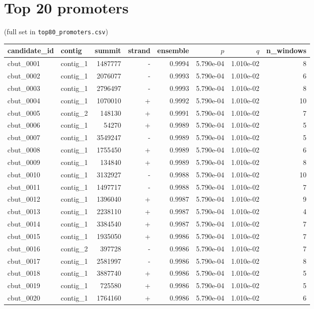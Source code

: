 \documentclass{article}
\begin{document}
\section*{Top 20 promoters}
(full set in \texttt{top80\_promoters.csv})
\begin{center}
\begin{tabular}{llrrrrrr}
\toprule
candidate\_id & contig & summit & strand & ensemble & $p$ & $q$ & n\_windows \\
\midrule
cbut\_0001 & contig\_1 & 1487777 & - & 0.9994 & 5.790e-04 & 1.010e-02 & 8 \\
cbut\_0002 & contig\_1 & 2076077 & - & 0.9993 & 5.790e-04 & 1.010e-02 & 6 \\
cbut\_0003 & contig\_1 & 2796497 & - & 0.9993 & 5.790e-04 & 1.010e-02 & 8 \\
cbut\_0004 & contig\_1 & 1070010 & + & 0.9992 & 5.790e-04 & 1.010e-02 & 10 \\
cbut\_0005 & contig\_2 & 148130 & + & 0.9991 & 5.790e-04 & 1.010e-02 & 7 \\
cbut\_0006 & contig\_1 & 54270 & + & 0.9989 & 5.790e-04 & 1.010e-02 & 5 \\
cbut\_0007 & contig\_1 & 3549247 & - & 0.9989 & 5.790e-04 & 1.010e-02 & 5 \\
cbut\_0008 & contig\_1 & 1755450 & + & 0.9989 & 5.790e-04 & 1.010e-02 & 6 \\
cbut\_0009 & contig\_1 & 134840 & + & 0.9989 & 5.790e-04 & 1.010e-02 & 8 \\
cbut\_0010 & contig\_1 & 3132927 & - & 0.9988 & 5.790e-04 & 1.010e-02 & 10 \\
cbut\_0011 & contig\_1 & 1497717 & - & 0.9988 & 5.790e-04 & 1.010e-02 & 7 \\
cbut\_0012 & contig\_1 & 1396040 & + & 0.9987 & 5.790e-04 & 1.010e-02 & 9 \\
cbut\_0013 & contig\_1 & 2238110 & + & 0.9987 & 5.790e-04 & 1.010e-02 & 4 \\
cbut\_0014 & contig\_1 & 3384540 & + & 0.9987 & 5.790e-04 & 1.010e-02 & 7 \\
cbut\_0015 & contig\_1 & 1935050 & + & 0.9986 & 5.790e-04 & 1.010e-02 & 7 \\
cbut\_0016 & contig\_2 & 397728 & - & 0.9986 & 5.790e-04 & 1.010e-02 & 7 \\
cbut\_0017 & contig\_1 & 2581997 & - & 0.9986 & 5.790e-04 & 1.010e-02 & 8 \\
cbut\_0018 & contig\_1 & 3887740 & + & 0.9986 & 5.790e-04 & 1.010e-02 & 5 \\
cbut\_0019 & contig\_1 & 725580 & + & 0.9986 & 5.790e-04 & 1.010e-02 & 5 \\
cbut\_0020 & contig\_1 & 1764160 & + & 0.9986 & 5.790e-04 & 1.010e-02 & 6 \\
\bottomrule
\end{tabular}
\end{center}
\end{document}
